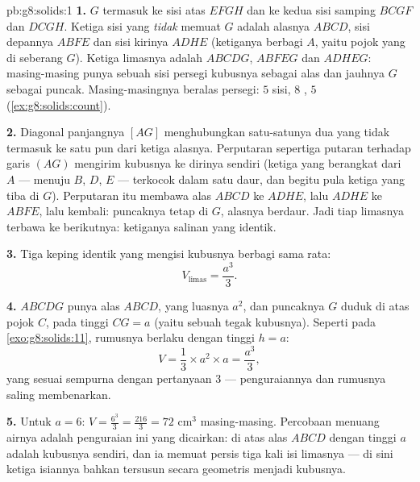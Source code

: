 \begin{solution}{pb:g8:solids:1}
\textbf{1.} $G$ termasuk ke sisi atas $EFGH$ dan ke kedua
sisi samping $BCGF$ dan $DCGH$. Ketiga sisi yang \emph{tidak}
memuat $G$ adalah alasnya $ABCD$, sisi depannya $ABFE$ dan
sisi kirinya $ADHE$ (ketiganya berbagi  $A$, yaitu pojok
yang di seberang $G$). Ketiga limasnya adalah $ABCDG$, $ABFEG$ dan
$ADHEG$: masing-masing punya sebuah sisi persegi kubusnya sebagai
alas dan  jauhnya $G$ sebagai puncak. Masing-masingnya
 beralas persegi: $5$ sisi, $8$ , $5$ 
(\cref{ex:g8:solids:count}).

\textbf{2.} Diagonal panjangnya $[AG]$ menghubungkan satu-satunya dua
 yang tidak termasuk ke satu pun dari ketiga alasnya.
Perputaran sepertiga putaran terhadap garis $(AG)$ mengirim kubusnya
ke dirinya sendiri (ketiga  yang berangkat dari $A$ --- menuju
$B$, $D$, $E$ --- terkocok dalam satu daur, dan begitu pula ketiga
 yang tiba di $G$). Perputaran itu membawa alas $ABCD$ ke $ADHE$, lalu
$ADHE$ ke $ABFE$, lalu kembali: puncaknya tetap di $G$, alasnya
berdaur. Jadi tiap limasnya terbawa ke  berikutnya: ketiganya
salinan yang identik.

\textbf{3.} Tiga keping identik yang mengisi kubusnya berbagi
 sama rata:
\[
V_{\text{limas}} = \frac{a^3}{3} .
\]

\textbf{4.}  $ABCDG$ punya alas $ABCD$, yang luasnya $a^2$,
dan puncaknya $G$ duduk  di atas pojok $C$, pada tinggi
$CG = a$ (yaitu sebuah  tegak kubusnya). Seperti pada
\cref{exo:g8:solids:11}, rumusnya berlaku dengan
tinggi  $h = a$:
\[
V = \frac13 \times a^2 \times a = \frac{a^3}{3} ,
\]
yang sesuai sempurna dengan pertanyaan 3 --- penguraiannya dan
rumusnya saling membenarkan.

\textbf{5.} Untuk $a = 6$:
$V = \frac{6^3}{3} = \frac{216}{3} = 72$ cm$^3$ masing-masing.
Percobaan menuang airnya adalah penguraian ini yang dicairkan:
 di atas alas $ABCD$ dengan tinggi $a$ adalah kubusnya sendiri,
dan ia memuat persis tiga kali isi limasnya --- di sini ketiga
isiannya bahkan tersusun secara geometris menjadi kubusnya.


\end{solution}
